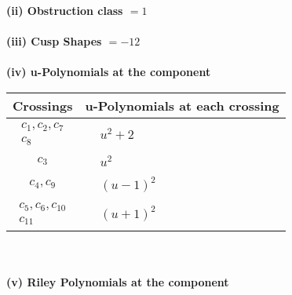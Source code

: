 \documentclass[1p]{elsarticle_modified}
\theoremstyle{definition}
\begin{document}
\flushleft \textbf{(ii) Obstruction class $= 1$}\\~\\
\flushleft \textbf{(iii) Cusp Shapes $= -12$}\\~\\
\newpage\renewcommand{\arraystretch}{1}
\flushleft \textbf{(iv) u-Polynomials at the component}\newline \\
\begin{tabular}{m{50pt}|m{274pt}}
Crossings & \hspace{64pt}u-Polynomials at each crossing \\
\hline $$\begin{aligned}c_{1},c_{2},c_{7}\\c_{8}\end{aligned}$$&$\begin{aligned}
&u^2+2
\end{aligned}$\\
\hline $$\begin{aligned}c_{3}\end{aligned}$$&$\begin{aligned}
&u^2
\end{aligned}$\\
\hline $$\begin{aligned}c_{4},c_{9}\end{aligned}$$&$\begin{aligned}
&(u-1)^2
\end{aligned}$\\
\hline $$\begin{aligned}c_{5},c_{6},c_{10}\\c_{11}\end{aligned}$$&$\begin{aligned}
&(u+1)^2
\end{aligned}$\\
\hline
\end{tabular}\\~\\
\newpage\renewcommand{\arraystretch}{1}
\flushleft \textbf{(v) Riley Polynomials at the component}\newline \\
\end{document}
